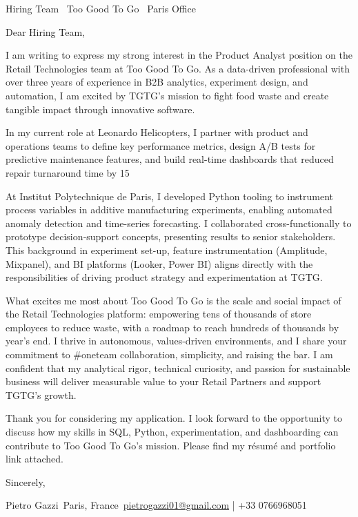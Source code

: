 \documentclass[a4paper,10pt]{letter}
\begin{document}
\begin{letter}{Hiring Team \
Too Good To Go \
Paris Office}

\opening{Dear Hiring Team,}

I am writing to express my strong interest in the Product Analyst position on the Retail Technologies team at Too Good To Go. As a data-driven professional with over three years of experience in B2B analytics, experiment design, and automation, I am excited by TGTG’s mission to fight food waste and create tangible impact through innovative software.

In my current role at Leonardo Helicopters, I partner with product and operations teams to define key performance metrics, design A/B tests for predictive maintenance features, and build real-time dashboards that reduced repair turnaround time by 15%

At Institut Polytechnique de Paris, I developed Python tooling to instrument process variables in additive manufacturing experiments, enabling automated anomaly detection and time-series forecasting. I collaborated cross-functionally to prototype decision‑support concepts, presenting results to senior stakeholders. This background in experiment set-up, feature instrumentation (Amplitude, Mixpanel), and BI platforms (Looker, Power BI) aligns directly with the responsibilities of driving product strategy and experimentation at TGTG.

What excites me most about Too Good To Go is the scale and social impact of the Retail Technologies platform: empowering tens of thousands of store employees to reduce waste, with a roadmap to reach hundreds of thousands by year’s end. I thrive in autonomous, values-driven environments, and I share your commitment to #oneteam collaboration, simplicity, and raising the bar. I am confident that my analytical rigor, technical curiosity, and passion for sustainable business will deliver measurable value to your Retail Partners and support TGTG’s growth.

Thank you for considering my application. I look forward to the opportunity to discuss how my skills in SQL, Python, experimentation, and dashboarding can contribute to Too Good To Go’s mission. Please find my résumé and portfolio link attached.

\closing{Sincerely,}

Pietro Gazzi\
Paris, France\
\href{mailto:pietrogazzi01@gmail.com}{pietrogazzi01@gmail.com} | +33 0766968051

\end{letter}
\end{document}

